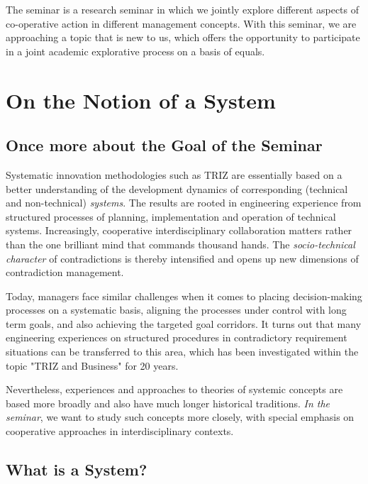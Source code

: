 \documentclass[11pt,a4paper]{article}
\begin{document}
The seminar is a research seminar in which we jointly explore different
aspects of co-operative action in different management concepts.  With this
seminar, we are approaching a topic that is new to us, which offers the
opportunity to participate in a joint academic explorative process on a basis
of equals. 

\section{On the Notion of a System}

\subsection{Once more about the Goal of the Seminar}

Systematic innovation methodologies such as TRIZ are essentially based on a
better understanding of the development dynamics of corresponding (technical
and non-technical) \emph{systems}.  The results are rooted in engineering
experience from structured processes of planning, implementation and operation
of technical systems. Increasingly, cooperative interdisciplinary
collaboration matters rather than the one brilliant mind that commands
thousand hands. The \emph{socio-technical character} of contradictions is
thereby intensified and opens up new dimensions of contradiction management.

Today, managers face similar challenges when it comes to placing
decision-making processes on a systematic basis, aligning the processes under
control with long term goals, and also achieving the targeted goal corridors.
It turns out that many engineering experiences on structured procedures in
contradictory requirement situations can be transferred to this area, which
has been investigated within the topic "TRIZ and Business" for 20 years.

Nevertheless, experiences and approaches to theories of systemic concepts are
based more broadly and also have much longer historical traditions.  \emph{In
  the seminar}, we want to study such concepts more closely, with special
emphasis on cooperative approaches in interdisciplinary contexts.

\subsection{What is a System?}
\end{document}
